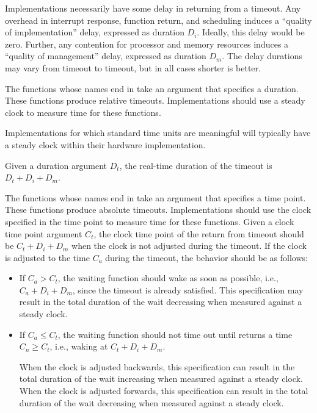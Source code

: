 \pnum
Implementations necessarily have some delay in returning from a timeout. Any overhead in
interrupt response, function return, and scheduling induces a ``quality of implementation''
delay, expressed as duration $D_i$. Ideally, this delay would be zero. Further, any contention for
processor and memory resources induces a ``quality of management'' delay, expressed as duration
$D_m$. The delay durations may vary from timeout to timeout, but in all cases shorter is better.

\pnum
The functions whose names end in  take an argument that
specifies a duration. These functions produce relative timeouts. Implementations
should use a steady clock to measure time for these functions.
\begin{footnote}
Implementations for which standard time units are meaningful will typically
have a steady clock within their hardware implementation.
\end{footnote}
Given a duration
argument $D_t$, the real-time duration of the timeout is $D_t + D_i + D_m$.

\pnum
The functions whose names end in  take an argument that specifies a time
point. These functions produce absolute timeouts. Implementations should use the clock
specified in the time point to measure time for these functions. Given a clock time point
argument $C_t$, the clock time point of the return from timeout should be $C_t + D_i + D_m$
when the clock is not adjusted during the timeout. If the clock is adjusted to the time $C_a$
during the timeout, the behavior should be as follows:
\begin{itemize}
\item
If $C_a > C_t$, the waiting function should wake as soon as possible, i.e., $C_a + D_i + D_m$,
since the timeout is already satisfied.
This specification may result in the total
duration of the wait decreasing when measured against a steady clock.

\item
If $C_a \leq C_t$, the waiting function should not time out until  returns a
time $C_n \geq C_t$, i.e., waking at $C_t + D_i + D_m$.
\begin{note}
When the clock is adjusted
backwards, this specification can result in the total duration of the wait increasing when
measured against a steady clock. When the clock is adjusted forwards, this specification can
result in the total duration of the wait decreasing when measured against a steady clock.
\end{note}
\end{itemize}

